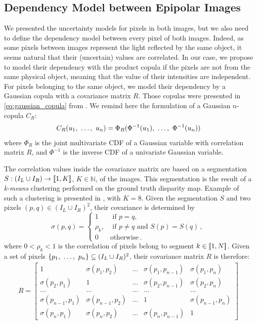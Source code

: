 \subsection{Dependency Model between Epipolar Images}
We presented the uncertainty models for pixels in both images, but we also need to define the dependency model between every pixel of both images. Indeed, as some pixels between images represent the light reflected by the same object, it seems natural that their (uncertain) values are correlated. In our case, we propose to model their dependency with the product copula if the pixels are not from the same physical object, meaning that the value of their intensities are independent. For pixels belonging to the same object, we model their dependency by a Gaussian copula with a covariance matrix $R$. Those copulas were presented in \cref{eq:gaussian_copula} from . We remind here the formulation of a Gaussian $n$-copula $C_R$:
\begin{align}
    C_R(u_1 , ~\dots, ~ u_n)=\Phi_R(\Phi^{-1}(u_1) , ~\dots, ~ \Phi^{-1}(u_n))\label{eq:gaussian_copula}
\end{align} where $\Phi_R$ is the joint multivariate CDF of a Gaussian variable with correlation matrix $R$, and $\Phi^{-1}$ is the inverse CDF of a univariate Gaussian variable.

The correlation values inside the covariance matrix are based on a segmentation $S:(I_L\cup I_R)\rightarrow[\![1,K]\!]$, $K\in\mathbb{N}$, of the images. This segmentation is the result of a \textit{k-means} clustering performed on the ground truth disparity map. Example of such a clustering is presented in , with $K=8$. Given the segmentation $S$ and two pixels $(p, q)\in(I_L\cup I_R)^2$, their covariance is determined by
\begin{equation}\label{eq:correlation}
    \sigma(p, q) =
    \begin{cases}
        1 &\text{ if }p=q,\\
        \rho_k, &\text{ if } p\ne q\text{ and }S(p)=S(q)\,, \\
        0 & \text{otherwise}\,.
    \end{cases}
\end{equation}
where $0<\rho_k<1$ is the correlation of pixels belong to segment $k\in[\![ 1, N]\!]$. Given a set of pixels $\{p_1 , ~\dots, ~ p_n\}\subseteq(I_L\cup I_R)^2$, their covariance matrix $R$ is therefore:
\begin{align}
    R = \begin{bmatrix}
        1 & \sigma(p_{1}, p_{2}) & \dots & \sigma(p_{1}, p_{n-1}) & \sigma(p_{1}, p_{n})\\
        \sigma(p_{2}, p_{1}) & 1 & \dots & \sigma(p_{2}, p_{n-1}) & \sigma(p_{2}, p_{n})\\
        \dots & \dots & \dots & \dots & \dots\\
        \sigma(p_{n-1}, p_{1}) & \sigma(p_{n-1}, p_{2}) & \dots & 1 & \sigma(p_{n-1}, p_{n})\\
        \sigma(p_{n}, p_{1}) & \sigma(p_{n}, p_{2}) & \dots & \sigma(p_{n}, p_{n-1}) & 1
    \end{bmatrix}
\end{align}

